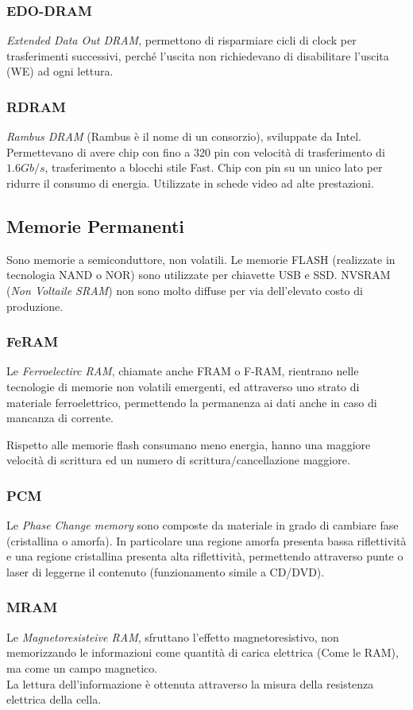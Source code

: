 \documentclass[../template]{subfiles}
\begin{document}
\subsubsection{EDO-DRAM}
\textit{Extended Data Out DRAM}, permettono di risparmiare cicli di clock per trasferimenti successivi, perché l'uscita non richiedevano di disabilitare l'uscita (WE) ad ogni lettura.

\subsubsection{RDRAM}
\textit{Rambus DRAM} (Rambus è il nome di un consorzio), sviluppate da Intel.
Permettevano di avere chip con fino a 320 pin con velocità di trasferimento di $1.6Gb/s$, trasferimento a blocchi stile Fast.
Chip con pin su un unico lato per ridurre il consumo di energia.
Utilizzate in schede video ad alte prestazioni.

\subsection{Memorie Permanenti}
Sono memorie a semiconduttore, non volatili.
Le memorie FLASH (realizzate in tecnologia NAND o NOR) sono utilizzate per chiavette USB e SSD.
NVSRAM (\textit{Non Voltaile SRAM}) non sono molto diffuse per via dell'elevato costo di produzione.
\subsubsection{FeRAM}
Le \textit{Ferroelectirc RAM}, chiamate anche FRAM o F-RAM, rientrano nelle tecnologie di memorie non volatili emergenti, ed attraverso uno strato di materiale ferroelettrico, permettendo la permanenza ai dati anche in caso di mancanza di corrente.

Rispetto alle memorie flash consumano meno energia, hanno una maggiore velocità di scrittura ed un numero di scrittura/cancellazione maggiore.
\subsubsection{PCM}
Le \textit{Phase Change memory} sono composte da materiale in grado di cambiare fase (cristallina o amorfa). In particolare una regione amorfa presenta bassa riflettività e una regione cristallina presenta alta riflettività, permettendo attraverso punte o laser di leggerne il contenuto (funzionamento simile a CD/DVD).

\subsubsection{MRAM}
Le \textit{Magnetoresisteive RAM}, sfruttano l'effetto magnetoresistivo, non memorizzando le informazioni come quantità di carica elettrica (Come le RAM), ma come un campo magnetico.
\\
La lettura dell'informazione è ottenuta attraverso la misura della resistenza elettrica della cella.
\end{document}
